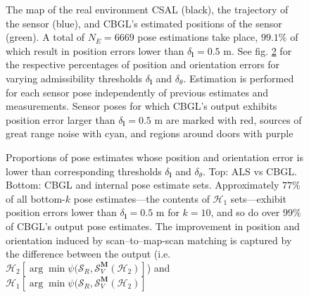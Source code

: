 \begin{figure}
  \vspace{-0.7cm}
  
  \vspace{-0.7cm}
  \caption{\small The map of the real environment CSAL (black), the trajectory
           of the sensor (blue), and CBGL's estimated positions of the sensor
           (green). A total of $N_E = 6669$ pose estimations take place,
           $99.1\%$ of which result in position errors lower than
           $\delta_{\bm{l}} = 0.5$ m. See fig. \ref{fig:a:awesomeness}
           for the respective percentages of position and orientation errors
           for varying admissibility thresholds $\delta_{\bm{l}}$ and
           $\delta_{\theta}$.
           Estimation is performed for each sensor
           pose independently of previous estimates and measurements. Sensor
           poses for which CBGL's output exhibits position error larger than
           $\delta_{\bm{l}} = 0.5$ m are marked with red, sources of great
           range noise with cyan, and regions around doors with purple
           }
  \label{fig:a:map_and_trajectory}
  \vspace{-0.5cm}
\end{figure}

\begin{figure}
  \vspace{-0.3cm}
  
  \vspace{0.01cm}
  \caption{\small Proportions of pose estimates whose position and orientation
           error is lower than corresponding thresholds $\delta_{\bm{l}}$ and
           $\delta_{\theta}$. Top: ALS vs CBGL. Bottom: CBGL and internal pose
           estimate sets.  Approximately $77\%$ of all bottom-$k$ pose
           estimates---the contents of $\mathcal{H}_1$ sets---exhibit
           position errors lower than $\delta_{\bm{l}} = 0.5$ m for $k=10$, and
           so do over $99\%$ of CBGL's output pose estimates. The improvement in
           position and orientation induced by scan--to--map-scan matching is
           captured by the difference between the output (i.e.
           $\mathcal{H}_2[\arg \min \psi(\mathcal{S}_R, \mathcal{S}_V^{\bm{M}}(\mathcal{H}_2)]$) and
           $\mathcal{H}_1[\arg \min \psi(\mathcal{S}_R, \mathcal{S}_V^{\bm{M}}(\mathcal{H}_2)]$}
  \vspace{-0.7cm}
  \label{fig:a:awesomeness}
\end{figure}


